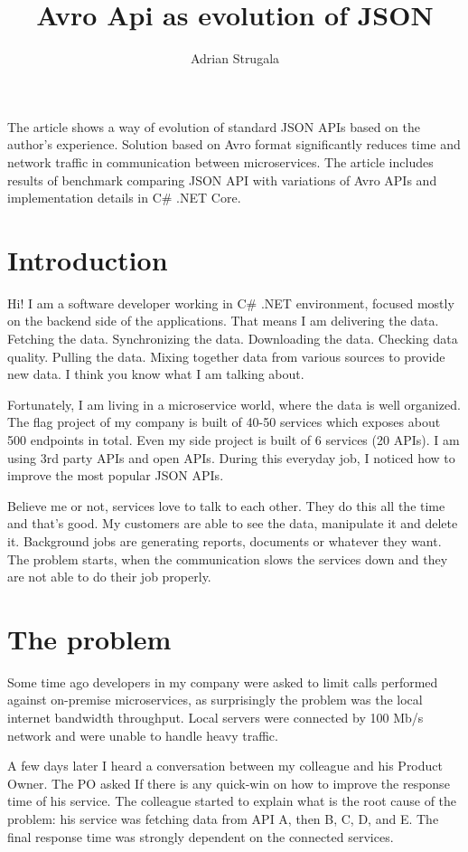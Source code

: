 \documentclass[]{article}
\title{Avro Api as evolution of JSON}
\author{Adrian Strugala}
\begin{document}
\maketitle

The article shows a way of evolution of standard JSON APIs based on the author's experience. Solution based on Avro format significantly reduces time and network traffic in communication between microservices. The article includes results of benchmark comparing JSON API with variations of Avro APIs and implementation details in C\# .NET Core.

\section{Introduction}

Hi! I am a software developer working in C\# .NET environment, focused mostly on the backend side of the applications. That means I am delivering the data. Fetching the data. Synchronizing the data. Downloading the data. Checking data quality. Pulling the data. Mixing together data from various sources to provide new data. I think you know what I am talking about.

Fortunately, I am living in a microservice world, where the data is well organized. The flag project of my company is built of 40-50 services which exposes about 500 endpoints in total. Even my side project is built of 6 services (20 APIs). I am using 3rd party APIs and open APIs. During this everyday job, I noticed how to improve the most popular JSON APIs.

Believe me or not, services love to talk to each other. They do this all the time and that's good. My customers are able to see the data, manipulate it and delete it. Background jobs are generating reports, documents or whatever they want. The problem starts, when the communication slows the services down and they are not able to do their job properly.


\section{The problem}

Some time ago developers in my company were asked to limit calls performed against on-premise microservices, as surprisingly the problem was the local internet bandwidth throughput. Local servers were connected by 100 Mb/s network and were unable to handle heavy traffic.

A few days later I heard a conversation between my colleague and his Product Owner. The PO asked If there is any quick-win on how to improve the response time of his service. The colleague started to explain what is the root cause of the problem: his service was fetching data from API A, then B, C, D, and E. The final response time was strongly dependent on the connected services. 
\end{document}
